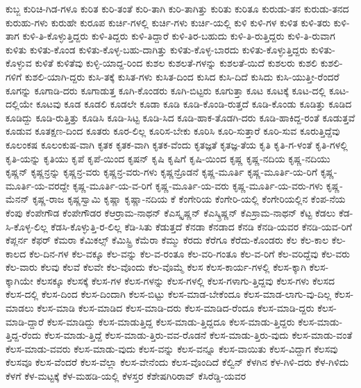 {ಕುಬ್ಜ
ಕುರಿಚಿ-ಗಿಡ-ಗಳೂ
ಕುರಿತ
ಕುರಿ-ತಂತೆ
ಕುರಿ-ತಾಗಿ
ಕುರಿ-ತಾಗಿತ್ತು
ಕುರಿತು
ಕುರಿತೂ
ಕುರುಡು-ತನ
ಕುರುಡು-ತನದ
ಕುರುಹು-ಗಳು
ಕುರುಹೇ
ಕುರೂಪ
ಕುರ್ಚಿ-ಗಳಲ್ಲಿ
ಕುರ್ಚಿ-ಗಳು
ಕುರ್ಚಿ-ಯಲ್ಲಿ
ಕುಳಿ
ಕುಳಿ-ಗಳ
ಕುಳಿತ
ಕುಳಿ-ತರು
ಕುಳಿ-ತಾಗ
ಕುಳಿ-ತಿ-ಕೊಳ್ಳುತ್ತಿದ್ದರು
ಕುಳಿ-ತಿದ್ದರು
ಕುಳಿ-ತಿದ್ದಾರೆ
ಕುಳಿ-ತಿರ-ಬಹುದು
ಕುಳಿ-ತಿ-ರುತ್ತಿದ್ದರು
ಕುಳಿ-ತಿ-ರುವಾಗ
ಕುಳಿತು
ಕುಳಿತು-ಕೊಂಡ
ಕುಳಿತು-ಕೊಳ್ಳ-ಬಹು-ದಾಗಿತ್ತು
ಕುಳಿತು-ಕೊಳ್ಳ-ಬಾರದು
ಕುಳಿತು-ಕೊಳ್ಳುತ್ತಿದ್ದರು
ಕುಳಿತು-ಕೊಳ್ಳುವ
ಕುಳಿತೆ
ಕುಳಿತೆವು
ಕುಳ್ಳಿ-ಯಾದ್ದ-ರಿಂದ
ಕುಶಲ
ಕುಶಲತೆ-ಗಳನ್ನು
ಕುಶಲತೆ-ಯಿದೆ
ಕುಶಲರು
ಕುಶಲಿ
ಕುಶಲಿ-ಗಳಿಗೆ
ಕುಶಲಿ-ಯಾಗಿ-ದ್ದರು
ಕುಸಿ-ತಕ್ಕೆ
ಕುಸಿತ-ಗಳು
ಕುಸಿತ-ದಿಂದ
ಕುಸಿದ
ಕುಸಿ-ದಿದೆ
ಕುಸಿದು
ಕುಸಿ-ಯುತ್ತೀ-ರೆಂದರೆ
ಕೂಗನ್ನು
ಕೂಗಾಡಿ-ದರು
ಕೂಗಾಡುತ್ತ
ಕೂಗಿ-ಕೊಂಡರು
ಕೂಗಿ-ಬಿಟ್ಟರು
ಕೂಗುತ್ತಾ
ಕೂಟ
ಕೂಟಕ್ಕೆ
ಕೂಟ-ದಲ್ಲಿ
ಕೂಟ-ದಲ್ಲಿಯೇ
ಕೂಟವು
ಕೂಡ
ಕೂಡಲಿ
ಕೂಡಲೇ
ಕೂಡಾ
ಕೂಡಿ
ಕೂಡಿ-ಕೊಂಡಿ-ರುತ್ತದೆ
ಕೂಡಿ-ಕೊಂಡು
ಕೂಡಿತ್ತು
ಕೂಡಿದ
ಕೂಡಿದ್ದು
ಕೂಡಿ-ರುತ್ತಿತ್ತು
ಕೂಡಿಸಿ
ಕೂಡಿ-ಸಿಟ್ಟ
ಕೂಡಿ-ಸಿದ
ಕೂಡಿ-ಹಾಕ-ತೊಡಗಿ-ದರು
ಕೂಡಿ-ಹಾಕಿದ್ದ-ರಂತೆ
ಕೂಡುತ್ತವೆ
ಕೂಡುವ
ಕೂತಕ್ಷಣ-ದಿಂದ
ಕೂತರು
ಕೂರ-ಲಿಲ್ಲ
ಕೂರಿಸ-ಬೇಕು
ಕೂರಿಸಿ
ಕೂರಿ-ಸುತ್ತಾರೆ
ಕೂರಿ-ಸುವ
ಕೂರುತ್ತಿದ್ದೆವು
ಕೂಲಂಕಷ
ಕೂಲಂಕುಷ-ವಾಗಿ
ಕೃತಕ
ಕೃತಕ-ವಾಗಿ
ಕೃತಕ-ವೆಂದು
ಕೃತಜ್ಞತೆ
ಕೃತಜ್ಞ-ತೆಯ
ಕೃತಿ
ಕೃತಿ-ಗ-ಳಂತೆ
ಕೃತಿ-ಗಳಲ್ಲಿ
ಕೃತಿ-ಯನ್ನು
ಕೃತಿಯು
ಕೃಪೆ
ಕೃಪೆ-ಯಿಂದ
ಕೃಷನ್
ಕೃಷಿ
ಕೃಷಿಗೆ
ಕೃಷಿ-ಯಿಂದ
ಕೃಷ್ಣ
ಕೃಷ್ಣ-ನದಿಯ
ಕೃಷ್ಣ-ನದಿಯು
ಕೃಷ್ಣನ್
ಕೃಷ್ಣನ್ರನ್ನು
ಕೃಷ್ಣನ್ರ-ವರು
ಕೃಷ್ಣನ್ರ-ವರು-ಗಳು
ಕೃಷ್ಣನ್ರೊಡನೆ
ಕೃಷ್ಣ-ಮೂರ್ತಿ
ಕೃಷ್ಣ-ಮೂರ್ತಿ-ಯ-ರಿಗೆ
ಕೃಷ್ಣ-ಮೂರ್ತಿ-ಯ-ವರದ್ದೇ
ಕೃಷ್ಣ-ಮೂರ್ತಿ-ಯ-ವ-ರಿಗೆ
ಕೃಷ್ಣ-ಮೂರ್ತಿ-ಯ-ವರು
ಕೃಷ್ಣ-ಮೂರ್ತಿ-ಯ-ವರು-ಗಳು
ಕೃಷ್ಣ-ಮೆನನ್
ಕೃಷ್ಣ-ರಾಜ
ಕೃಷ್ಣಸ್ವಾಮಿ
ಕೃಷ್ಣಾ
ಕೃಷ್ಣಾ-ನದಿಯ
ಕೆ
ಕೆಂಗೇರಿಯ
ಕೆಂಗೇರಿ-ಯಲ್ಲಿ
ಕೆಂಗೇರಿಯಲ್ಲಿನ
ಕೆಂಪ-ನೆಯ
ಕೆಂಪು
ಕೆಂಪೇಗೌಡ
ಕೆಂಪೇಗೌಡರ
ಕೆಆರ್ರಾಮ-ನಾಥನ್
ಕೆಎಸ್ಕೃಷ್ಣನ್
ಕೆಎಸ್ಕ್ರಿಷ್ಣನ್
ಕೆಎಸ್ರಾಮ-ನಾಥನ್
ಕೆಟ್ಟ
ಕೆಡಲು
ಕೆಡ-ಸಿ-ಕೊಳ್ಳ-ಲಿಲ್ಲ
ಕೆಡಸಿ-ಕೊಳ್ಳುತ್ತಿ-ರ-ಲಿಲ್ಲ
ಕೆಡಿ-ಸಿತು
ಕೆಡುತ್ತದೆ
ಕೆನಡಾ
ಕೆನಡಾದ
ಕೆನಡಿ
ಕೆನಡಿ-ಯವರ
ಕೆನಡಿ-ಯವ-ರಿಗೆ
ಕೆಪ್ಲರ್ನ
ಕೆಫರ್
ಕೆಮರಾ
ಕೆಮಿಕಲ್ಸ್
ಕೆಮಿಸ್ಟ್ರಿ
ಕೆಮೆರಾ
ಕೆಮ್ಮು
ಕೆರದು
ಕೆರೆಗೂ
ಕೆರೆದು-ಕೊಂಡರು
ಕೆಲ
ಕೆಲ-ಕಾಲ
ಕೆಲ-ಕಾಲದ
ಕೆಲ-ದಿನ-ಗಳ
ಕೆಲ-ವಕ್ಕೂ
ಕೆಲ-ವನ್ನು
ಕೆಲ-ವ-ರಂತೂ
ಕೆಲ-ವರಿ-ಗಂತೂ
ಕೆಲ-ವ-ರಿಗೆ
ಕೆಲ-ವರಿದ್ದೆವು
ಕೆಲ-ವರು
ಕೆಲ-ವಾರು
ಕೆಲವು
ಕೆಲವೆ
ಕೆಲವೇ
ಕೆಲ-ವೊಂದು
ಕೆಲ-ವೊಮ್ಮೆ
ಕೆಲಸ
ಕೆಲಸ-ಕಾರ್ಯ-ಗಳಲ್ಲಿ
ಕೆಲಸ-ಕ್ಕಾಗಿ
ಕೆಲಸ-ಕ್ಕಾಗಿಯೇ
ಕೆಲಸಕ್ಕೂ
ಕೆಲಸಕ್ಕೆ
ಕೆಲಸ-ಗಳ
ಕೆಲಸ-ಗಳನ್ನು
ಕೆಲಸ-ಗಳಲ್ಲಿ
ಕೆಲಸ-ಗಳಾಗು-ತ್ತಿದ್ದವು
ಕೆಲಸ-ಗಳು
ಕೆಲಸದ
ಕೆಲಸ-ದಲ್ಲಿ
ಕೆಲಸ-ದಿಂದ
ಕೆಲಸ-ದಿಂದಾಗಿ
ಕೆಲಸ-ಬಿಟ್ಟು
ಕೆಲಸ-ಮಾಡ-ಬೇಕೆಂದೂ
ಕೆಲಸ-ಮಾಡ-ಲಾಗು-ವು-ದಿಲ್ಲ
ಕೆಲಸ-ಮಾಡಲು
ಕೆಲಸ-ಮಾಡಿ
ಕೆಲಸ-ಮಾಡಿದ
ಕೆಲಸ-ಮಾಡಿ-ದರು
ಕೆಲಸ-ಮಾಡಿದ-ರೆಂದೂ
ಕೆಲಸ-ಮಾಡಿ-ದ್ದರು
ಕೆಲಸ-ಮಾಡಿ-ದ್ದಾರೆ
ಕೆಲಸ-ಮಾಡಿದ್ದು
ಕೆಲಸ-ಮಾಡುತ್ತಿದ್ದ
ಕೆಲಸ-ಮಾಡು-ತ್ತಿದ್ದದೂ
ಕೆಲಸ-ಮಾಡು-ತ್ತಿದ್ದರು
ಕೆಲಸ-ಮಾಡು-ತ್ತಿದ್ದ-ರೆಂದು
ಕೆಲಸ-ಮಾಡು-ತ್ತಿದ್ದೆ
ಕೆಲಸ-ಮಾಡು-ತ್ತಿರು-ವವ-ರೊಡನೆ
ಕೆಲಸ-ಮಾಡು-ತ್ತಿರು-ವುದು
ಕೆಲಸ-ಮಾಡು-ವಂತೆ
ಕೆಲಸ-ಮಾಡು-ವವರು
ಕೆಲಸ-ಮಾಡು-ವುದು
ಕೆಲಸ-ವನ್ನು
ಕೆಲಸ-ವನ್ನೂ
ಕೆಲಸ-ವಾಯಿತು
ಕೆಲಸ-ವಿದ್ದಾಗ
ಕೆಲಸವು
ಕೆಲಸವೂ
ಕೆಲಸ-ವೆಂದರೆ
ಕೆಲಸ-ವೆಲ್ಲಾ
ಕೆಲಸ-ವೇನೆಂದು
ಕೆಲಸ-ವೊಂದಿದೆ
ಕೆಲ್ವಿನ್
ಕೆಳಗಿನ
ಕೆಳ-ಗಿಳಿ-ದರು
ಕೆಳ-ಗಿಳಿದು
ಕೆಳಗೆ
ಕೆಳ-ಮಟ್ಟಕ್ಕೆ
ಕೆಳ-ಮಹಡಿ-ಯಲ್ಲಿ
ಕೆಳಸ್ತರ
ಕೆಶೇಷಗಿರಿರಾವ್
ಕೆಸಿರೆಡ್ಡಿ-ಯವರ
}
